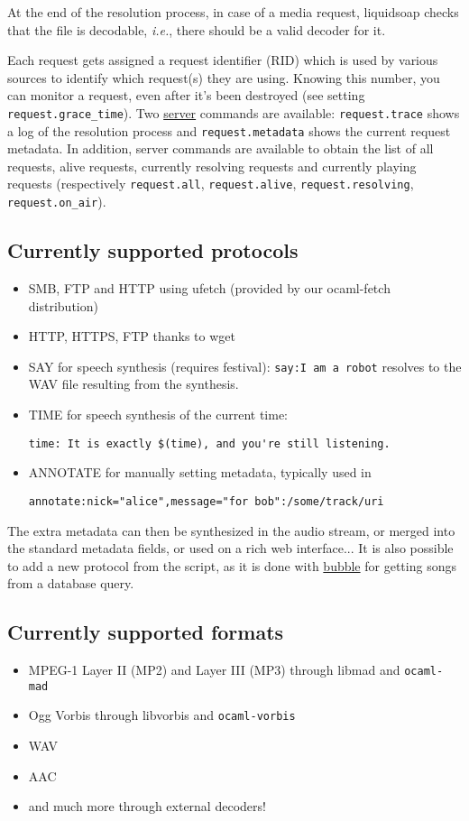 At the end of the resolution process, in case of a media request,
liquidsoap checks that the file is decodable,
\emph{i.e.}, there should be a valid decoder for it.

Each request gets assigned a request identifier (RID) which is used by
various sources to identify which request(s) they are using. Knowing
this number, you can monitor a request, even after it's been destroyed
(see setting \verb+request.grace_time+). Two \href{server.html}{server}
commands are available: \verb+request.trace+ shows a log of
the resolution process and \verb+request.metadata+ shows the
current request metadata. In addition, server commands are available
to obtain the list of all requests, alive requests, currently resolving
requests and currently playing requests (respectively
\verb+request.all+,
\verb+request.alive+,
\verb+request.resolving+,
\verb+request.on_air+).

\subsection{Currently supported protocols}
\begin{itemize}
\item SMB, FTP and HTTP using ufetch (provided by our ocaml-fetch distribution)
\item HTTP, HTTPS, FTP thanks to wget
\item SAY for speech synthesis (requires festival): \verb+say:I am a robot+ resolves to the WAV file resulting from the synthesis.
\item TIME for speech synthesis of the current time: \begin{verbatim}
time: It is exactly $(time), and you're still listening.
\end{verbatim}

\item ANNOTATE for manually setting metadata, typically used in \begin{verbatim}
annotate:nick="alice",message="for bob":/some/track/uri
\end{verbatim}


\end{itemize}
The extra metadata can then be synthesized in the audio stream, or merged into the standard metadata fields, or used on a rich web interface...
It is also possible to add a new protocol from the script, as it is done with \href{bubble.html}{bubble} for getting songs from a database query.

\subsection{Currently supported formats}
\begin{itemize}
\item MPEG-1 Layer II (MP2) and Layer III (MP3) through libmad and \verb+ocaml-mad+
\item Ogg Vorbis through libvorbis and \verb+ocaml-vorbis+
\item WAV
\item AAC
\item and much more through external decoders!

\end{itemize}
